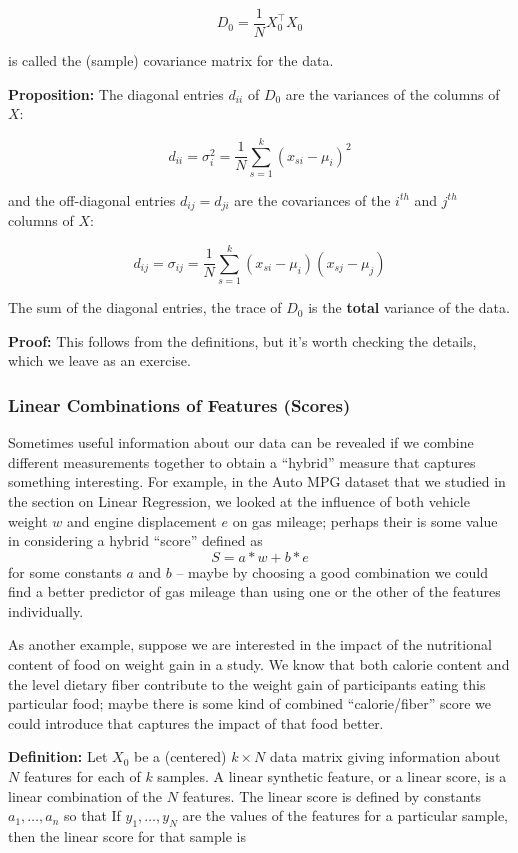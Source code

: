\documentclass[
]{article}
\begin{document}
\[
D_{0} = \frac{1}{N}X_{0}^{\intercal}X_{0}
\]

is called the (sample) covariance matrix for the data.

\textbf{Proposition:} The diagonal entries \(d_{ii}\) of \(D_{0}\) are
the variances of the columns of \(X\):

\[
d_{ii} = \sigma_{i}^2 = \frac{1}{N}\sum_{s=1}^{k}(x_{si}-\mu_i)^2
\]

and the off-diagonal entries \(d_{ij} = d_{ji}\) are the covariances of
the \(i^{th}\) and \(j^{th}\) columns of \(X\):

\[
d_{ij} = \sigma_{ij} = \frac{1}{N}\sum_{s=1}^{k}(x_{si}-\mu_{i})(x_{sj}-\mu_{j})
\]

The sum of the diagonal entries, the trace of \(D_{0}\) is the
\textbf{total} variance of the data.

\textbf{Proof:} This follows from the definitions, but it's worth
checking the details, which we leave as an exercise.

\hypertarget{linear-combinations-of-features-scores}{%
\subsubsection{Linear Combinations of Features
(Scores)}\label{linear-combinations-of-features-scores}}

Sometimes useful information about our data can be revealed if we
combine different measurements together to obtain a ``hybrid'' measure
that captures something interesting. For example, in the Auto MPG
dataset that we studied in the section on Linear Regression, we looked
at the influence of both vehicle weight \(w\) and engine displacement
\(e\) on gas mileage; perhaps their is some value in considering a
hybrid ``score'' defined as \[
S = a*w + b*e
\] for some constants \(a\) and \(b\) -- maybe by choosing a good
combination we could find a better predictor of gas mileage than using
one or the other of the features individually.

As another example, suppose we are interested in the impact of the
nutritional content of food on weight gain in a study. We know that both
calorie content and the level dietary fiber contribute to the weight
gain of participants eating this particular food; maybe there is some
kind of combined ``calorie/fiber'' score we could introduce that
captures the impact of that food better.

\textbf{Definition:} Let \(X_{0}\) be a (centered) \(k\times N\) data
matrix giving information about \(N\) features for each of \(k\)
samples. A linear synthetic feature, or a linear score, is a linear
combination of the \(N\) features. The linear score is defined by
constants \(a_{1},\ldots, a_{n}\) so that If \(y_{1},\ldots, y_{N}\) are
the values of the features for a particular sample, then the linear
score for that sample is
\end{document}
